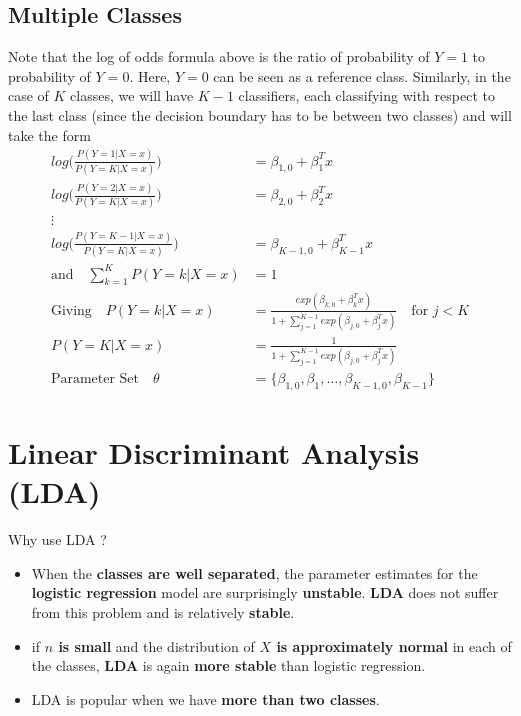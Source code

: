 \documentclass[../statistical_learning_notes.tex]{subfiles}
\begin{document}
    \subsection{Multiple Classes}
    Note that the log of odds formula above is the ratio of probability of $Y=1$ to probability of $Y=0$. Here, $Y=0$ can be seen as a reference class. Similarly, in the case of $K$ classes, we will have $K-1$ classifiers, each classifying with respect to the last class (since the decision boundary has to be between two classes) and will take the form
    \begin{align*}
        log \big( \frac{P(Y=1|X=x)}{P(Y=K|X=x)} \big) &= \beta_{1,0} + \beta_{1}^{T}x\\
        log \big( \frac{P(Y=2|X=x)}{P(Y=K|X=x)} \big) &= \beta_{2,0} + \beta_{2}^{T}x\\
        \vdots\\
        log \big( \frac{P(Y=K-1|X=x)}{P(Y=K|X=x)} \big) &= \beta_{K-1,0} + \beta_{K-1}^{T}x\\
        \text{and} \quad \sum_{k=1}^{K} P(Y=k|X=x) &= 1\\
        \text{Giving} \quad P(Y=k|X=x) &= \frac{exp(\beta_{k,0} + \beta_{k}^{T}x)}{1 + \sum_{j=1}^{K-1} exp(\beta_{j,0} + \beta_{j}^{T}x)} \quad \text{for $j<K$}\\
        P(Y=K|X=x) &= \frac{1}{1 + \sum_{j=1}^{K-1} exp(\beta_{j,0} + \beta_{j}^{T}x)}\\
        \text{Parameter Set} \quad \theta &= \{ \beta_{1,0}, \beta_{1}, \ldots, \beta_{K-1,0}, \beta_{K-1} \}
    \end{align*}

    \section{Linear Discriminant Analysis (LDA)}
    Why use LDA ?
    \begin{itemize}
        \item When the \textbf{classes are well separated}, the parameter estimates for the \textbf{logistic regression} model are surprisingly \textbf{unstable}. \textbf{LDA} does not suffer from this problem and is relatively \textbf{stable}.
        \item if \textbf{$n$ is small} and the distribution of \textbf{$X$ is approximately normal} in each of the classes, \textbf{LDA} is again \textbf{more stable} than logistic regression.
        \item LDA is popular when we have \textbf{more than two classes}.
    \end{itemize}
\end{document}
